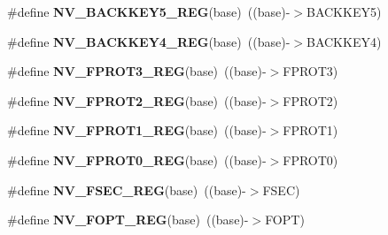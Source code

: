 \begin{DoxyCompactItemize}
\item 
\mbox{\label{group___n_v___register___accessor___macros_ga8c8a046af59b1a140ff75cc826b355aa}} 
\#define {\bfseries N\+V\+\_\+\+B\+A\+C\+K\+K\+E\+Y5\+\_\+\+R\+EG}(base)~((base)-\/$>$B\+A\+C\+K\+K\+E\+Y5)
\item 
\mbox{\label{group___n_v___register___accessor___macros_gaf87830b9bc5bb55e664df8929d49eac1}} 
\#define {\bfseries N\+V\+\_\+\+B\+A\+C\+K\+K\+E\+Y4\+\_\+\+R\+EG}(base)~((base)-\/$>$B\+A\+C\+K\+K\+E\+Y4)
\item 
\mbox{\label{group___n_v___register___accessor___macros_ga7ef7bb75074b8db9da605af5ca216f74}} 
\#define {\bfseries N\+V\+\_\+\+F\+P\+R\+O\+T3\+\_\+\+R\+EG}(base)~((base)-\/$>$F\+P\+R\+O\+T3)
\item 
\mbox{\label{group___n_v___register___accessor___macros_gabac2653345915e29796a13ba870336c3}} 
\#define {\bfseries N\+V\+\_\+\+F\+P\+R\+O\+T2\+\_\+\+R\+EG}(base)~((base)-\/$>$F\+P\+R\+O\+T2)
\item 
\mbox{\label{group___n_v___register___accessor___macros_ga2cb779bd7985368b49343a7a4227a4c2}} 
\#define {\bfseries N\+V\+\_\+\+F\+P\+R\+O\+T1\+\_\+\+R\+EG}(base)~((base)-\/$>$F\+P\+R\+O\+T1)
\item 
\mbox{\label{group___n_v___register___accessor___macros_ga7142989d8224cb5f1b5e466c72363e3a}} 
\#define {\bfseries N\+V\+\_\+\+F\+P\+R\+O\+T0\+\_\+\+R\+EG}(base)~((base)-\/$>$F\+P\+R\+O\+T0)
\item 
\mbox{\label{group___n_v___register___accessor___macros_ga67787d311ca4c58b135b4427b0431dca}} 
\#define {\bfseries N\+V\+\_\+\+F\+S\+E\+C\+\_\+\+R\+EG}(base)~((base)-\/$>$F\+S\+EC)
\item 
\mbox{\label{group___n_v___register___accessor___macros_ga0fd99fc3ae6d1b27bb5e0448f6c90761}} 
\#define {\bfseries N\+V\+\_\+\+F\+O\+P\+T\+\_\+\+R\+EG}(base)~((base)-\/$>$F\+O\+PT)

\end{DoxyCompactItemize}
